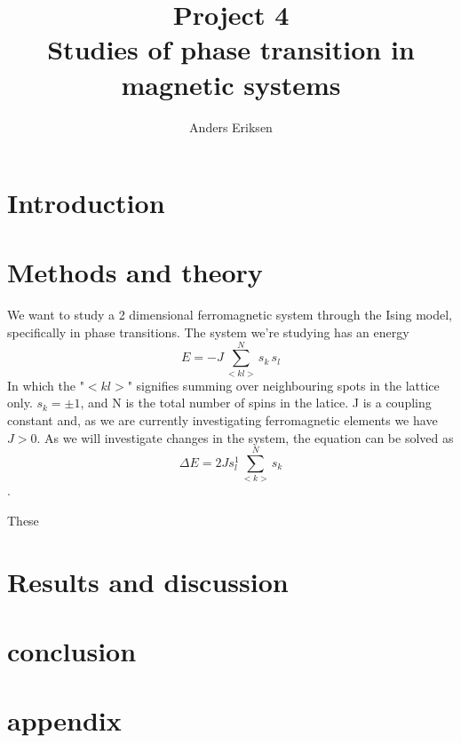 \documentclass[10pt, twocolumn]{revtex4-1}
\begin{document}
\title{%
    Project 4\\
    \large Studies of phase transition in magnetic systems}
\author{Anders Eriksen}
\begin{abstract}
\end{abstract}
\maketitle

\section{Introduction}


\section{Methods and theory}

We want to study a 2 dimensional ferromagnetic system through the Ising model, specifically in phase transitions.
The system we're studying has an energy 
\[ E = -J \sum_{<kl>}^N s_k \, s_l \]
In which the "$<kl>$" signifies summing over neighbouring spots in the lattice only. $s_k = \pm 1$, and N is the total number of spins in 
the latice. J is a coupling constant and, as we are currently investigating ferromagnetic elements we have $J > 0$.
As we will investigate changes in the system, the equation can be solved as
\[ \Delta E = 2 Js_l^1 \sum_{<k>}^N s_k \].

These 


\section{Results and discussion}

\section{conclusion}

\section{appendix}



\end{document}
